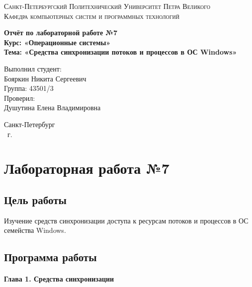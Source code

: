 \documentclass[14pt,a4paper,report]{report}
\begin{document}
\def\contentsname{Содержание}

\begin{titlepage}
	\begin{center}
		\textsc{Санкт-Петербургский Политехнический 
			Университет Петра Великого\\[5mm]
			Кафедра компьютерных систем и программных технологий}
		
		\vfill
		
		\textbf{Отчёт по лабораторной работе №7\\[3mm]
			Курс: «Операционные системы»\\[6mm]
			Тема: «Средства синхронизации потоков и процессов в ОС Windows»\\[35mm]
		}
	\end{center}
	
	\hfill
	\begin{minipage}{.5\textwidth}
		Выполнил студент:\\[2mm] 
		Бояркин Никита Сергеевич\\
		Группа: 43501/3\\[5mm]
		
		Проверил:\\[2mm] 
		Душутина Елена Владимировна
	\end{minipage}
	\vfill
	\begin{center}
		Санкт-Петербург\\ \the\year\ г.
	\end{center}
\end{titlepage}

\tableofcontents
\clearpage

\chapter{Лабораторная работа №7}

\section{Цель работы}

Изучение средств синхронизации доступа к ресурсам потоков и процессов в ОС семейства Windows.

\section{Программа работы}

\subsubsection{Глава 1. Средства синхронизации}
\end{document}
